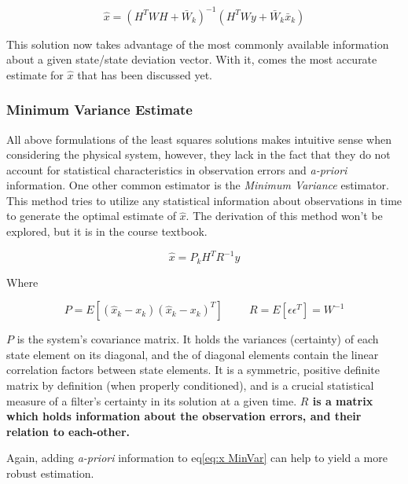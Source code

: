 \documentclass[12pt,a4paper,oneside]{article}
\numberwithin{equation}{section}   		%
\newcommand{\bad}[1]{\color{red}\textbf{#1}\color{black}}
\begin{document}
\begin{equation}
	\hat{x} = (H^TW  H + \bar{W}_k)^{-1}  (H^T W y + \bar{W}_k   \bar{x}_k)
	\label{eq:x WLSap}
\end{equation}

This solution now takes advantage of the most commonly available information about a given state/state deviation vector. With it, comes the most accurate estimate for $\hat{x}$ that has been discussed yet. 

\subsubsection{Minimum Variance Estimate}
\label{OD sub MinVar}
All above formulations of the least squares solutions makes intuitive sense when considering the physical system, however, they lack in the fact that they do not account for statistical characteristics in observation errors and \emph{a-priori} information. One other common estimator is the \emph{Minimum Variance} estimator. This method tries to utilize any statistical information about observations in time to generate the optimal estimate of $\hat{x}$. The derivation of this method won't be explored, but it is in the course textbook. 

\begin{equation}
	\hat{x} = P_k H^T R^{-1} y
	\label{eq:x MinVar}
\end{equation}

Where

\begin{displaymath}
	P = E[(\hat{x}_k - x_k)(\hat{x}_k - x_k)^T]
	\hspace{1cm}
	R=E[\epsilon \epsilon^T] = W^{-1}
\end{displaymath}


$P$ is the system's covariance matrix. It holds the variances (certainty) of each state element on its diagonal, and the of diagonal elements contain the linear correlation factors between state elements. It is a symmetric, positive definite matrix by definition (when properly conditioned), and is a crucial statistical measure of a filter's certainty in its solution at a given time. \bad{$R$ is a matrix which holds information about the observation errors, and their relation to each-other. }

Again, adding \emph{a-priori} information to eq\eqref{eq:x MinVar} can help to yield a more robust estimation.
\end{document}

